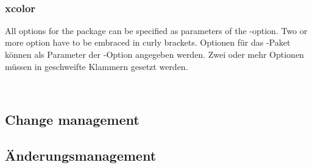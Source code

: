 \\

\subsubsection{xcolor}

\ifENGLISH
All options for the  package can be specified as parameters of the -option.
Two or more option have to be embraced in curly brackets.
\fi
\ifGERMAN
	Optionen für das -Paket können als Parameter der -Option angegeben werden.
	Zwei oder mehr Optionen müssen in geschweifte Klammern gesetzt werden.
\fi

\\

\ifENGLISH
\subsection{Change management}
\fi
\ifGERMAN
	\subsection{Änderungsmanagement}
\fi

